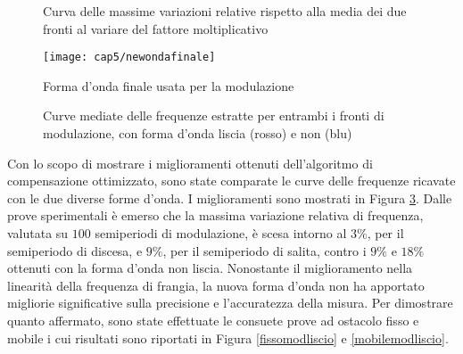 \begin{figure}[H]
	\centering
\end{figure}
\begin{figure}[H]
	\centering
	\caption{Curva delle massime variazioni relative rispetto alla media dei due fronti al variare del fattore moltiplicativo}\label{mulfactnew}
\end{figure}
    \begin{figure}[H]
    	\begin{center}
    		\texttt{[image: cap5/newondafinale]}
    		\caption{Forma d'onda finale usata per la modulazione}
    		\label{newondafinale}
    	\end{center}
    \end{figure}

\begin{figure}[H]
	\centering
\end{figure}
\begin{figure}[H]
	\centering
	\caption{Curve mediate delle frequenze estratte per entrambi i fronti di modulazione, con forma d'onda liscia (rosso) e non (blu)}\label{primadopocompnew}
\end{figure}
Con lo scopo di mostrare i miglioramenti ottenuti dell'algoritmo di compensazione ottimizzato, sono state comparate le curve delle frequenze ricavate con le due diverse forme d'onda. I miglioramenti sono mostrati in Figura \ref{primadopocompnew}. Dalle prove sperimentali è emerso che la massima variazione relativa di frequenza, valutata su $100$ semiperiodi di modulazione, è scesa intorno al $3\%$, per il semiperiodo di discesa, e $9\%$, per il semiperiodo di salita, contro i $9\%$ e $18\%$ ottenuti con la forma d'onda non liscia.
Nonostante il miglioramento nella linearità della frequenza di frangia, la nuova forma d'onda non ha apportato migliorie significative sulla precisione e l'accuratezza della misura. Per dimostrare quanto affermato, sono state effettuate le consuete prove ad ostacolo fisso e mobile i cui risultati sono riportati in Figura \ref{fissomodliscio} e \ref{mobilemodliscio}.

